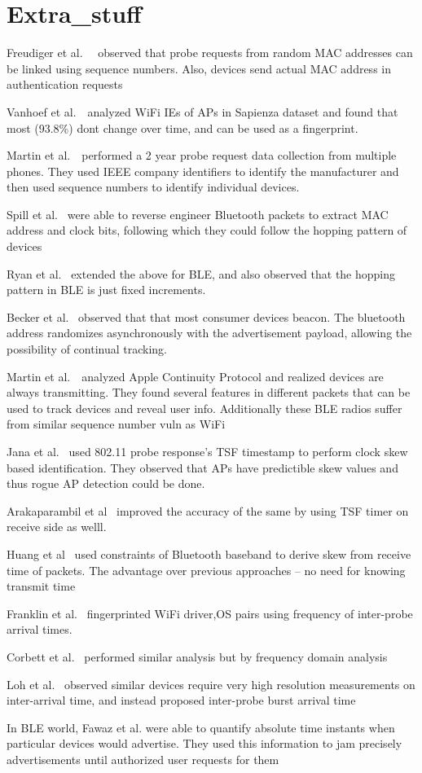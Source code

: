 \section{Extra_stuff}
\label{sec:extra_stuff}

Freudiger et al.~\cite{sn1}~ observed that probe requests from random MAC addresses can be linked using sequence numbers. Also, devices send actual MAC address in authentication requests

Vanhoef et al.~\cite{infelem1}~analyzed WiFi IEs of APs in Sapienza dataset and found that most (93.8\%) dont change over time, and can be used as a fingerprint.

Martin et al.~\cite{infelem3}~performed a 2 year probe request data collection from multiple phones. They used IEEE company identifiers to identify the manufacturer and then used sequence numbers to identify individual devices.

Spill et al.~\cite{spill2007bluesniff} were able to reverse engineer Bluetooth packets to extract MAC address and clock bits, following which they could follow the hopping pattern of devices

Ryan et al.~\cite{ryanble} extended the above for BLE, and also observed that the hopping pattern in BLE is just fixed increments.

Becker et al.~\cite{Iphonetracking_becker} observed that that most consumer devices beacon. The bluetooth address randomizes asynchronously with the advertisement payload, allowing the possibility of continual tracking.

Martin et al.~\cite{MACRandomizationfail_Martin}~analyzed Apple Continuity Protocol and realized devices are always transmitting. They found several features in different packets that can be used to track devices and reveal user info. Additionally these BLE radios suffer from similar sequence number vuln as WiFi


Jana et al.~\cite{clockskew1} used 802.11 probe response's TSF timestamp to perform clock skew based identification. They observed that APs have predictible skew values and thus rogue AP detection could be done. 

Arakaparambil et al~\cite{clockskew2} improved the accuracy of the same by using TSF timer on receive side as welll.

Huang et al~\cite{clockskew3} used constraints of Bluetooth baseband to derive skew from receive time of packets. The advantage over previous approaches -- no need for knowing transmit time

Franklin et al.~\cite{ifat1} fingerprinted WiFi driver,OS pairs using frequency of inter-probe arrival times.

Corbett et al.~\cite{rateswitching2} performed similar analysis but by frequency domain analysis

Loh et al.~\cite{devicediscovery1} observed similar devices require very high resolution measurements on inter-arrival time, and instead proposed inter-probe burst arrival time

In BLE world, Fawaz et al. were able to quantify absolute time instants when particular devices would advertise. They used this information to jam precisely advertisements until authorized user requests for them
